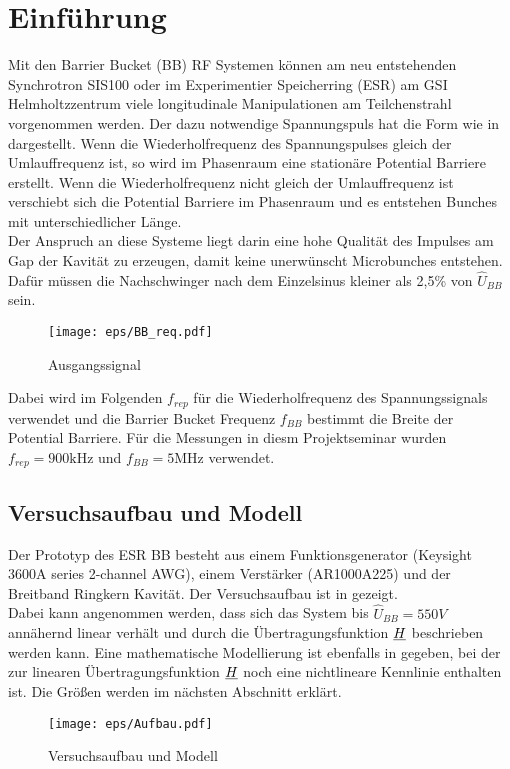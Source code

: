 \documentclass[../Report.tex]{subfiles}
\begin{document}
\chapter{Einführung}
\label{chap:einfuehrung}
Mit den Barrier Bucket (BB) RF Systemen können am neu entstehenden Synchrotron SIS100 oder im Experimentier Speicherring (ESR) am GSI Helmholtzzentrum viele longitudinale Manipulationen am Teilchenstrahl vorgenommen werden. Der dazu notwendige Spannungspuls hat die Form wie in  dargestellt. Wenn die Wiederholfrequenz des Spannungspulses gleich der Umlauffrequenz ist, so wird im Phasenraum eine stationäre Potential Barriere erstellt. Wenn die Wiederholfrequenz nicht gleich der Umlauffrequenz ist verschiebt sich die Potential Barriere im Phasenraum und es entstehen Bunches mit unterschiedlicher Länge.\\ Der Anspruch an diese Systeme liegt darin eine hohe Qualität des Impulses am Gap der Kavität zu erzeugen, damit keine unerwünscht Microbunches entstehen. Dafür müssen die Nachschwinger nach dem Einzelsinus kleiner als 2,5\% von $\hat{U}_{BB}$ sein.
\begin{figure}[H]
  \centering
  \texttt{[image: eps/BB\_req.pdf]}
  \caption{Ausgangssignal}
  \label{fig:BB_req}
\end{figure}

Dabei wird im Folgenden $f_{rep}$ für die Wiederholfrequenz des Spannungssignals verwendet und die Barrier Bucket Frequenz $f_{BB}$ bestimmt die Breite der Potential Barriere. Für die Messungen in diesm Projektseminar wurden ${f_{rep} = 900 \si{\kilo \hertz}}$ und ${f_{BB} = 5 \si{\mega \hertz}}$ verwendet.


\section[Modell und Konvention]{Versuchsaufbau und Modell}
\label{sec:einf.modell_BB}
Der Prototyp des ESR BB besteht aus einem Funktionsgenerator (Keysight 3600A series 2-channel AWG), einem Verstärker (AR1000A225) und der Breitband Ringkern Kavität. Der Versuchsaufbau ist in  gezeigt.\\Dabei kann angenommen werden, dass sich das System bis $\hat{U}_{BB} = 550V$ annähernd linear verhält und durch die Übertragungsfunktion $\underline{H}$ beschrieben werden kann. Eine mathematische Modellierung ist ebenfalls in  gegeben, bei der zur linearen Übertragungsfunktion $\underline{H}$ noch eine nichtlineare Kennlinie enthalten ist. Die Größen werden im nächsten Abschnitt erklärt.
\begin{figure}[H]
	\centering
	\texttt{[image: eps/Aufbau.pdf]}
	\caption{Versuchsaufbau und Modell}
  	\label{fig:Aufbau}
\end{figure}
\end{document}
